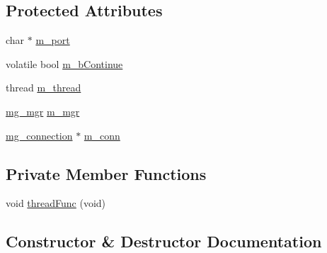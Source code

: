 \subsection*{Protected Attributes}
\begin{DoxyCompactItemize}
\item 
char $\ast$ \hyperlink{classTBT_1_1WSClientInterface_a5a2b51f344e17b5f3e9b1f3e861b6efe_a5a2b51f344e17b5f3e9b1f3e861b6efe}{m\+\_\+port}
\item 
volatile bool \hyperlink{classTBT_1_1WSClientInterface_a888e4be88a311199a3fa890d3abc6a10_a888e4be88a311199a3fa890d3abc6a10}{m\+\_\+b\+Continue}
\item 
thread \hyperlink{classTBT_1_1WSClientInterface_af8db3d6b3e3923b0b61f43cbc2021a92_af8db3d6b3e3923b0b61f43cbc2021a92}{m\+\_\+thread}
\item 
\hyperlink{structmg__mgr}{mg\+\_\+mgr} \hyperlink{classTBT_1_1WSClientInterface_aba2e99d7dcc90848ce6348ee687affbb_aba2e99d7dcc90848ce6348ee687affbb}{m\+\_\+mgr}
\item 
\hyperlink{structmg__connection}{mg\+\_\+connection} $\ast$ \hyperlink{classTBT_1_1WSClientInterface_ae866ad6fbf964a4b6ad1e19895bb24be_ae866ad6fbf964a4b6ad1e19895bb24be}{m\+\_\+conn}
\end{DoxyCompactItemize}
\subsection*{Private Member Functions}
\begin{DoxyCompactItemize}
\item 
void \hyperlink{classTBT_1_1WSClientInterface_a31d6d80e7a6cfb760d3ceee536477677_a31d6d80e7a6cfb760d3ceee536477677}{thread\+Func} (void)
\end{DoxyCompactItemize}


\subsection{Constructor \& Destructor Documentation}
\mbox{\label{classTBT_1_1WSClientInterface_addd44890c3c54a9700a2385a63105e38_addd44890c3c54a9700a2385a63105e38}} 
